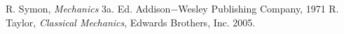 %

\nocite{*}
%
%

\begin{thebibliography}{00}
 R. Symon, \textit{Mechanics} 3a. Ed. Addison$-$Wesley Publishing Company, 1971
 R. Taylor, \textit{Classical Mechanics}, Edwards Brothers, Inc. 2005.
\end{thebibliography}






